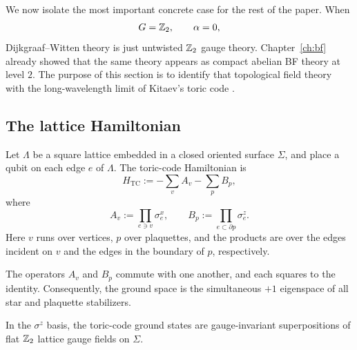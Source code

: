 We now isolate the most important concrete case for the rest of the paper. When
\begin{equation*}
G=\mathbb{Z}_2,
\qquad
\alpha=0,
\end{equation*}
Dijkgraaf--Witten theory is just untwisted $\mathbb{Z}_2$ gauge theory. Chapter~\ref{ch:bf} already showed that the same theory appears as compact abelian BF theory at level $2$. The purpose of this section is to identify that topological field theory with the long-wavelength limit of Kitaev's toric code \cite{Kitaev2003}.

\subsection{The lattice Hamiltonian}

\begin{definition}\label{def:toric-code}
Let $\Lambda$ be a square lattice embedded in a closed oriented surface $\Sigma$, and place a qubit on each edge $e$ of $\Lambda$. The toric-code Hamiltonian is
\begin{equation}\label{eq:toric-hamiltonian}
H_{\mathrm{TC}}
:=
-\sum_v A_v-\sum_p B_p,
\end{equation}
where
\begin{equation}\label{eq:toric-stabilizers}
A_v:=\prod_{e\ni v}\sigma_e^x,
\qquad
B_p:=\prod_{e\subset \partial p}\sigma_e^z.
\end{equation}
Here $v$ runs over vertices, $p$ over plaquettes, and the products are over the edges incident on $v$ and the edges in the boundary of $p$, respectively.
\end{definition}

\noindent The operators $A_v$ and $B_p$ commute with one another, and each squares to the identity. Consequently, the ground space is the simultaneous $+1$ eigenspace of all star and plaquette stabilizers.

\begin{proposition}\label{prop:toric-z2}
In the $\sigma^z$ basis, the toric-code ground states are gauge-invariant superpositions of flat $\mathbb{Z}_2$ lattice gauge fields on $\Sigma$.
\end{proposition}

